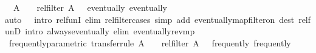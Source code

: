 \begin{isabellebody}
\ \ {\isachardoublequoteopen}{\isacharparenleft}{\kern0pt}{\isacharparenleft}{\kern0pt}A\ {\isacharequal}{\kern0pt}{\isacharequal}{\kern0pt}{\isacharequal}{\kern0pt}{\isachargreater}{\kern0pt}\ {\isacharparenleft}{\kern0pt}{\isacharequal}{\kern0pt}{\isacharparenright}{\kern0pt}{\isacharparenright}{\kern0pt}\ {\isacharequal}{\kern0pt}{\isacharequal}{\kern0pt}{\isacharequal}{\kern0pt}{\isachargreater}{\kern0pt}\ rel{\isacharunderscore}{\kern0pt}filter\ A\ {\isacharequal}{\kern0pt}{\isacharequal}{\kern0pt}{\isacharequal}{\kern0pt}{\isachargreater}{\kern0pt}\ {\isacharparenleft}{\kern0pt}{\isacharequal}{\kern0pt}{\isacharparenright}{\kern0pt}{\isacharparenright}{\kern0pt}\ eventually\ eventually{\isachardoublequoteclose}\isanewline
%
\isadelimproof
%
\endisadelimproof
%
\isatagproof
{}\isamarkupfalse%
{\isacharparenleft}{\kern0pt}auto\ {}\ {}\ intro{\isacharbang}{\kern0pt}{\isacharcolon}{\kern0pt}\ rel{\isacharunderscore}{\kern0pt}funI\ elim{\isacharbang}{\kern0pt}{\isacharcolon}{\kern0pt}\ rel{\isacharunderscore}{\kern0pt}filter{\isachardot}{\kern0pt}cases\ simp\ add{\isacharcolon}{\kern0pt}\ eventually{\isacharunderscore}{\kern0pt}map{\isacharunderscore}{\kern0pt}filter{\isacharunderscore}{\kern0pt}on\ dest{\isacharcolon}{\kern0pt}\ rel{\isacharunderscore}{\kern0pt}funD\ intro{\isacharcolon}{\kern0pt}\ always{\isacharunderscore}{\kern0pt}eventually\ elim{\isacharbang}{\kern0pt}{\isacharcolon}{\kern0pt}\ eventually{\isacharunderscore}{\kern0pt}rev{\isacharunderscore}{\kern0pt}mp{\isacharparenright}{\kern0pt}%
\endisatagproof
{\isafoldproof}%
%
\isadelimproof
\isanewline
%
\endisadelimproof
\isanewline
{}\isamarkupfalse%
\ frequently{\isacharunderscore}{\kern0pt}parametric\ {\isacharbrackleft}{\kern0pt}transfer{\isacharunderscore}{\kern0pt}rule{\isacharbrackright}{\kern0pt}{\isacharcolon}{\kern0pt}\ {\isachardoublequoteopen}{\isacharparenleft}{\kern0pt}{\isacharparenleft}{\kern0pt}A\ {\isacharequal}{\kern0pt}{\isacharequal}{\kern0pt}{\isacharequal}{\kern0pt}{\isachargreater}{\kern0pt}\ {\isacharparenleft}{\kern0pt}{\isacharequal}{\kern0pt}{\isacharparenright}{\kern0pt}{\isacharparenright}{\kern0pt}\ {\isacharequal}{\kern0pt}{\isacharequal}{\kern0pt}{\isacharequal}{\kern0pt}{\isachargreater}{\kern0pt}\ rel{\isacharunderscore}{\kern0pt}filter\ A\ {\isacharequal}{\kern0pt}{\isacharequal}{\kern0pt}{\isacharequal}{\kern0pt}{\isachargreater}{\kern0pt}\ {\isacharparenleft}{\kern0pt}{\isacharequal}{\kern0pt}{\isacharparenright}{\kern0pt}{\isacharparenright}{\kern0pt}\ frequently\ frequently{\isachardoublequoteclose}\isanewline

\end{isabellebody}
